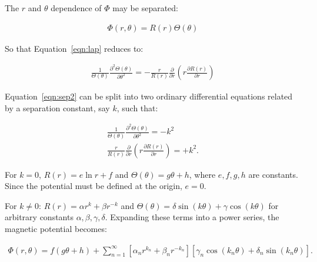 The $r$ and $\theta$ dependence of $\Phi$ may be separated: 

\begin{center}
\begin{eqnarray}
\label{eqn:sep}
\Phi(r,\theta) = R(r)\Theta(\theta)
\end{eqnarray}
\par\end{center} 

So that Equation~\ref{eqn:lap} reduces to:

\begin{center}
\begin{eqnarray}
\frac{1}{\Theta(\theta)}\frac{\partial^2\Theta(\theta)}{\partial \theta^2} = -\frac{r}{R(r)}\frac{\partial}{\partial r}\left(r\frac{\partial R(r)}{\partial r} \right)
\label{eqn:sep2}
\end{eqnarray}
\par\end{center} 

Equation~\ref{eqn:sep2} can be split into two ordinary differential equations related by a separation constant, say $k$, such that:

\begin{center}
\begin{subequations}
\begin{align} 
\frac{1}{\Theta(\theta)}\frac{\partial^2\Theta(\theta)}{\partial \theta^2} = -k^2 \\
\frac{r}{R(r)}\frac{\partial}{\partial r}\left(r\frac{\partial R(r)}{\partial r}\right) = +k^2 .
\end{align}
\label{eqn:sep3}
\end{subequations}
\par\end{center} 

For $k=0$, $R(r) = e\ln r+f$ and $\Theta(\theta) = g\theta+h$, where $e,f,g,h$ are constants.  Since the potential must be defined at the origin, $e=0$.

For $k\neq0$: $R(r) = \alpha r^k + \beta r^{-k}$ and $\Theta(\theta) = \delta \sin (k\theta)+\gamma \cos(k\theta)$ for arbitrary constants $\alpha,\beta,\gamma,\delta$.  Expanding these terms into a power series, the magnetic potential becomes:

\begin{center}
\begin{equation}
\begin{array}{c} 
\Phi(r,\theta) = f(g\theta+h)+\sum\limits_{n=1}^\infty \left[\alpha_n r^{k_n} + \beta_n r^{-k_n}\right]\left[\gamma_n \cos(k_n\theta) + \delta_n \sin(k_n\theta) \right].
\end{array}
\label{eqn:Phi}
\end{equation}
\par\end{center} 

